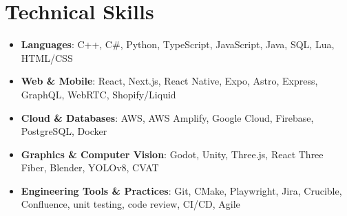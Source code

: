 \documentclass[letterpaper,11pt]{article}
\newcommand{\miscItem}[2]{
\item\small{
    \textbf{#1}{: #2 \vspace{-2pt}}
  }
}
\newcommand{\resumeSubItem}[2]{\miscItem{#1}{#2}\vspace{-4pt}}
\newcommand{\resumeSubHeadingListStart}{
\begin{itemize}[leftmargin=*]}
\newcommand{\resumeSubHeadingListEnd}{
  \end{itemize}}
\begin{document}
\section{Technical Skills}
\resumeSubHeadingListStart
\resumeSubItem{Languages}
{C++, C\#, Python, TypeScript, JavaScript, Java, SQL, Lua, HTML/CSS}
\resumeSubItem{Web \& Mobile}
{React, Next.js, React Native, Expo, Astro, Express, GraphQL, WebRTC, Shopify/Liquid}
\resumeSubItem{Cloud \& Databases}
{AWS, AWS Amplify, Google Cloud, Firebase, PostgreSQL, Docker}
\resumeSubItem{Graphics \& Computer Vision}
{Godot, Unity, Three.js, React Three Fiber, Blender, YOLOv8, CVAT}
\resumeSubItem{Engineering Tools \& Practices}
{Git, CMake, Playwright, Jira, Crucible, Confluence, unit testing, code review, CI/CD, Agile}
\resumeSubHeadingListEnd

\end{document}
